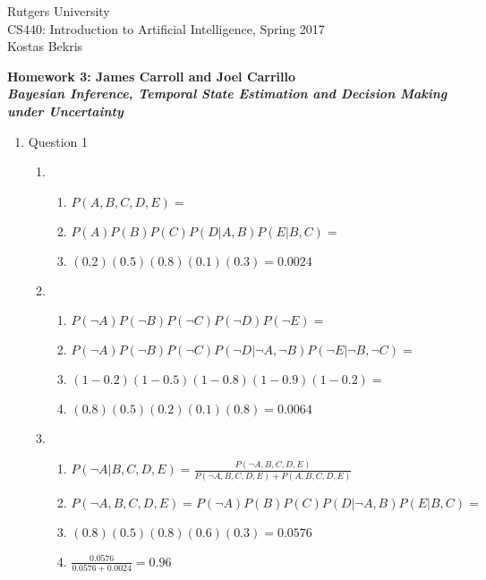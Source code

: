\documentclass[11pt]{article}
\begin{document}
\sloppy

\noindent Rutgers University\\
CS440: Introduction to Artificial Intelligence, Spring 2017\\
Kostas Bekris\\

\begin{center}
\LARGE{\textbf{Homework 3: James Carroll and Joel Carrillo}}\\
\large{\textbf{\emph{Bayesian Inference, Temporal State Estimation and Decision Making under Uncertainty}}}
\end{center}

\vspace{.1in}

\begin{enumerate}

\item Question 1
\begin{enumerate}

\item
\begin{enumerate}
\item $P(A, B, C, D, E) =$
\item $P(A)P(B)P(C)P(D|A,B)P(E|B,C) =$
\item $(0.2)(0.5)(0.8)(0.1)(0.3) = 0.0024$
\end{enumerate}

\item 
\begin{enumerate}
\item $P(\neg A)P(\neg B)P(\neg C)P(\neg D)P(\neg E) =$ 
\item $P(\neg A)P(\neg B)P(\neg C)P(\neg D|\neg A, \neg B)P(\neg E|\neg B, \neg C) =$
\item $(1 - 0.2)(1 - 0.5)(1 - 0.8)(1 - 0.9)(1 - 0.2) =$ 
\item $(0.8)(0.5)(0.2)(0.1)(0.8) = 0.0064$
\end{enumerate}

\item
\begin{enumerate}
\item $P(\neg A | B, C, D, E) =\frac{P(\neg A, B, C, D, E)}{P(\neg A, B, C, D, E) + P(A, B, C, D, E)}$ 
\item  $P(\neg A, B, C, D, E) = P(\neg A)P(B)P(C)P(D |\neg A, B)P(E | B, C) = $ \item $(0.8)(0.5)(0.8)(0.6)(0.3) = 0.0576$ 
\item $\frac{0.0576}{0.0576+0.0024} = 0.96$
\end{enumerate}


\end{enumerate}
\end{enumerate}
\end{document}

